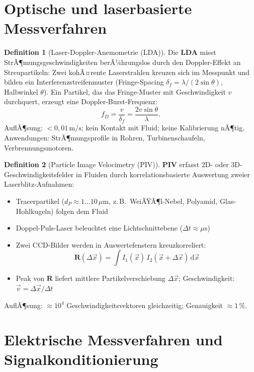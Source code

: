 ﻿\documentclass[a4paper,12pt]{report}
\theoremstyle{definition}
\newtheorem{definition}{Definition}
\begin{document}
\section{Optische und laserbasierte Messverfahren}

\begin{definition}[Laser-Doppler-Anemometrie (LDA)]
Die \textbf{LDA} misst StrÃ¶mungsgeschwindigkeiten berÃ¼hrungslos durch den
Doppler-Effekt an Streupartikeln:
Zwei kohÃ¤rente Laserstrahlen kreuzen sich im Messpunkt und bilden
ein Interferenzstreifenmuster (Fringe-Spacing $\delta_f = \lambda/(2\sin\theta)$,
Halbwinkel $\theta$). Ein Partikel, das das Fringe-Muster mit Geschwindigkeit $v$
durchquert, erzeugt eine Doppler-Burst-Frequenz:
\[
  f_D = \frac{v}{\delta_f} = \frac{2v\sin\theta}{\lambda}.
\]
AuflÃ¶sung: $< 0{,}01\,\mathrm{m/s}$; kein Kontakt mit Fluid; keine Kalibrierung nÃ¶tig.
Anwendungen: StrÃ¶mungsprofile in Rohren, Turbinenschaufeln, Verbrennungsmotoren.
\end{definition}

\begin{definition}[Particle Image Velocimetry (PIV)]
\textbf{PIV} erfasst 2D- oder 3D-Geschwindigkeitsfelder in Fluiden
durch korrelationsbasierte Auswertung zweier Laserblitz-Aufnahmen:
\begin{itemize}
    \item[-] Tracerpartikel ($d_P \approx 1\ldots10\,\mu\mathrm{m}$,
          z.\,B.\ WeiÃŸÃ¶l-Nebel, Polyamid, Glas-Hohlkugeln) folgen dem Fluid
    \item[-] Doppel-Puls-Laser beleuchtet eine Lichtschnittebene ($\Delta t \approx \mu\mathrm{s}$)
    \item[-] Zwei CCD-Bilder werden in Auswertefenstern kreuzkorreliert:
          \[
            \mathbf{R}(\Delta\vec{x}) = \int I_1(\vec{x})\,I_2(\vec{x}+\Delta\vec{x})\,\mathrm{d}\vec{x}
          \]
    \item[-] Peak von $\mathbf{R}$ liefert mittlere Partikelverschiebung
          $\Delta\vec{x}$; Geschwindigkeit: $\vec{v} = \Delta\vec{x}/\Delta t$
\end{itemize}
AuflÃ¶sung: $\approx 10^4$ Geschwindigkeitsvektoren gleichzeitig; Genauigkeit $\approx 1\,\%$.
\end{definition}

\section{Elektrische Messverfahren und Signalkonditionierung}
\end{document}
